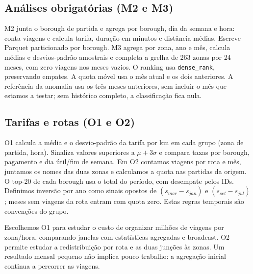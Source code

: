 \documentclass[sigconf]{acmart}
\begin{document}
\subsection{Análises obrigatórias (M2 e M3)}
M2 junta o borough de partida e agrega por borough, dia da semana e
hora: conta viagens e calcula tarifa, duração em minutos e distância
médias. Escreve Parquet particionado por borough. M3 agrega por zona,
ano e mês, calcula médias e desvios-padrão amostrais e completa a
grelha de 263 zonas por 24 meses, com zero viagens nos meses vazios.
O ranking usa \texttt{dense\_rank}, preservando empates. A quota
móvel usa o mês atual e os dois anteriores. A referência da anomalia
usa os três meses anteriores, sem incluir o mês que estamos a testar;
sem histórico completo, a classificação fica nula.

\subsection{Tarifas e rotas (O1 e O2)}
O1 calcula a média e o desvio-padrão da tarifa por km em cada grupo
(zona de partida, hora). Sinaliza valores superiores a
$\mu+3\sigma$ e compara taxas por borough, pagamento e dia útil/fim
de semana. Em O2 contamos viagens por rota e mês, juntamos os nomes
das duas zonas e calculamos a quota nas partidas da origem. O top-20
de cada borough usa o total do período, com desempate pelos IDs.
Definimos inversão por ano como sinais opostos de
$(s_{mar}-s_{jan})$ e $(s_{set}-s_{jul})$; meses sem viagens da rota
entram com quota zero. Estas regras temporais são convenções do grupo.

Escolhemos O1 para estudar o custo de organizar milhões de viagens
por zona/hora, comparando janelas com estatísticas agregadas e
broadcast. O2 permite estudar a redistribuição por rota e as duas
junções às zonas. Um resultado mensal pequeno não implica pouco
trabalho: a agregação inicial continua a percorrer as viagens.
\end{document}
